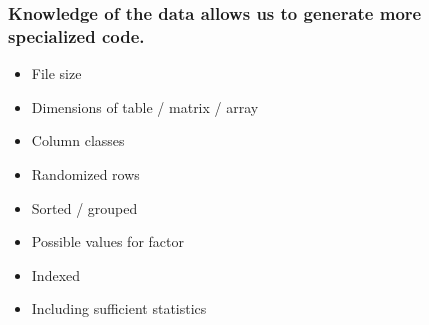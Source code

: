 \documentclass{beamer}
\begin{document}
\begin{frame}

    \frametitle{Knowledge of the data allows us to generate more
    specialized code.}

    \begin{itemize}

	\item File size
	\item Dimensions of table / matrix / array
	\item Column classes
	\item Randomized rows
	\item Sorted / grouped
	\item Possible values for factor
	\item Indexed
	\item Including sufficient statistics

    \end{itemize}

\end{frame}
\end{document}
